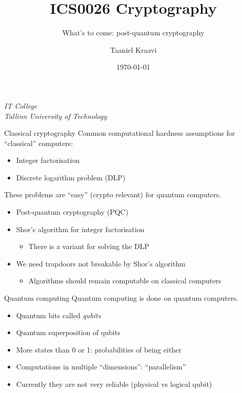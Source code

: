 \usetikzlibrary{positioning,calc,external,arrows.meta}

\title{ICS0026 Cryptography}
\subtitle{What's to come: post-quantum cryptography}
\date{\today}
\author{Taaniel Kraavi}
\institute%
{%
  \textit{IT College}\\
  \textit{Tallinn University of Technology}
}


\begin{frame}
  \titlepage
\end{frame}

\begin{frame}{Classical cryptography}
  Common computational hardness assumptions for \enquote{classical} computers:
  \begin{itemize}[<+(1)->]
    \item Integer factorisation
    \item Discrete logarithm problem (DLP)
  \end{itemize}

  \vspace*{1em}

  \pause
  These problems are \enquote{easy} (crypto relevant) for quantum computers.
  \begin{itemize}[<+(1)->]
    \item Post-quantum cryptography (PQC)
    \item Shor's algorithm for integer factorisation
    \begin{itemize}
      \item There is a variant for solving the DLP
    \end{itemize}
    \item We need trapdoors not breakable by Shor's algorithm
    \begin{itemize}
      \item Algorithms should remain computable on classical computers
    \end{itemize}
  \end{itemize}
\end{frame}

\begin{frame}{Quantum computing}
  Quantum computing is done on quantum computers.
  \begin{itemize}[<+(1)->]
    \item Quantum bits called \emph{qubits}
    \item Quantum superposition of qubits
    \item More states than 0 or 1: probabilities of being either
    \item Computations in multiple \enquote{dimensions}: \enquote{parallelism}
    \item Currently they are not very reliable (physical vs logical qubit)
  \end{itemize}
\end{frame}


